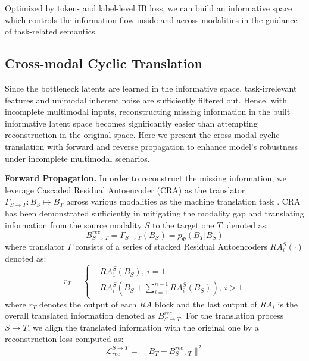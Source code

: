 \documentclass{article}
\begin{document}
Optimized by token- and label-level IB loss, we can build an informative space which controls the information flow inside and across modalities in the guidance of task-related semantics.
\subsection{Cross-modal Cyclic Translation}
Since the bottleneck latents are learned in the informative space, task-irrelevant features and unimodal inherent noise are sufficiently filtered out. Hence, with incomplete multimodal inputs, reconstructing missing information in the built informative latent space becomes significantly easier than attempting reconstruction in the original space. %
Here we present the cross-modal cyclic translation with forward and reverse propagation to enhance model's robustness under incomplete multimodal scenarios.

\textbf{Forward Propagation.} In order to reconstruct the missing information, we leverage Cascaded Residual Autoencoder (CRA) \cite{tran2017cra} as the translator $\Gamma_{S\rightarrow T}:B_S\mapsto B_T$ across various modalities as the machine translation task \cite{bahdanau2015neural}. CRA has been demonstrated sufficiently in mitigating the modality gap and translating information from the source modality $S$ to the target one $T$, denoted as:
\begin{equation}
    B_{S\rightarrow T}^{rec} =\Gamma_{S\rightarrow T}(B_S) = p_\Phi(B_T|B_S)
\end{equation}
where translator $\Gamma$ consists of a series of stacked Residual Autoencoders $RA^S_i(\cdot)$ denoted as:
\begin{equation}
    r_T=\left\{
    \begin{aligned}
    & RA^S_1(B_S),\ i=1 \\
    & RA^S_i(B_S+ \sum\nolimits^{n-1}_{i=1} RA^S_i(B_S)),\ i>1
    \end{aligned}
    \right.
\end{equation}
where $r_T$ denotes the output of each $RA$ block and the last output of $RA_i$ is the overall translated information denoted as $B_{S\rightarrow T}^{rec}$. For the translation process $S\rightarrow T$, we align the translated information with the original one by a reconstruction loss computed as:
\begin{equation}
    \mathcal{L}^{S\rightarrow T}_{rec} =\parallel B_T - B_{S\rightarrow T}^{rec} \parallel^2
\end{equation}
\end{document}
